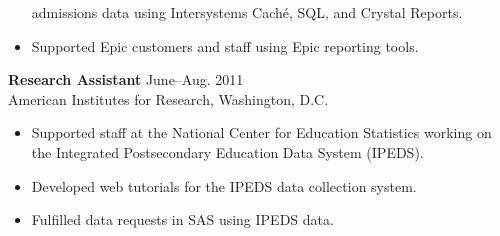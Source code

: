 \documentclass[line]{res}
\begin{document}
\begin{resume}
\begin{itemize}
  admissions data using Intersystems
  Cach\'{e}, SQL, and Crystal Reports.
\item Supported Epic customers and
  staff using Epic reporting tools.
\end{itemize}
{\bf Research Assistant}  \hfill June--Aug. 2011\\
American Institutes for Research, Washington, D.C.
\begin{itemize}
\item    Supported staff at the National Center for Education Statistics
   working on the Integrated Postsecondary Education Data System
   (IPEDS).
 \item Developed web tutorials for the IPEDS data collection
   system.
 \item Fulfilled data requests in SAS using IPEDS data.
\end{itemize}


\end{resume}
\end{document}

